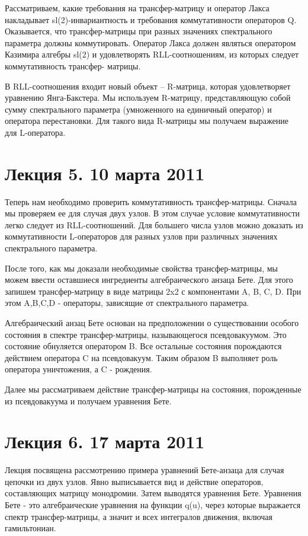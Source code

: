 \documentclass[a4paper,12pt]{article}
\theoremstyle{definition} \newtheorem{Def}{Definition}
\theoremstyle{definition}
\begin{document}
Рассматриваем, какие требования на трансфер-матрицу и оператор Лакса накладывает sl(2)-инвариантность и требования коммутативности операторов Q. Оказывается, что трансфер-матрицы при разных значениях спектрального параметра должны коммутировать. Оператор Лакса должен являться оператором Казимира алгебры sl(2) и удовлетворять RLL-соотношениям, из которых следует коммутативность трансфер- матрицы. 

В RLL-соотношения входит новый объект -- R-матрица, которая удовлетворяет уравнению Янга-Бакстера. Мы используем R-матрицу, представляющую собой сумму спектрального параметра (умноженного на единичный оператор) и оператора перестановки. 
Для такого вида R-матрицы мы получаем выражение для L-оператора.

\section{Лекция 5. 10 марта 2011}

Теперь нам необходимо проверить коммутативность трансфер-матрицы. 
Сначала мы проверяем ее для случая двух узлов. В этом случае условие коммутативности легко следует из RLL-соотношений. Для большего числа узлов можно доказать из коммутативности L-операторов для разных узлов при различных значениях спектрального параметра. 

После того, как мы доказали необходимые свойства трансфер-матрицы, мы можем ввести оставшиеся ингредиенты алгебраического анзаца Бете. Для этого запишем трансфер-матрицу в виде матрицы 2x2 с компонентами A, B, C, D. При этом A,B,C,D - операторы, зависящие от спектрального параметра.

Алгебраический анзац Бете основан на предположении о существовании особого состояния в спектре трансфер-матрицы, называющегося псевдовакуумом.  Это состояние обнуляется оператором B. Все остальные состояния порождаются действием оператора C на псевдовакуум. Таким образом B выполняет роль оператора уничтожения, а C - рождения. 

Далее мы рассматриваем действие трансфер-матрицы на состояния, порожденные из псевдовакуума и получаем уравнения Бете.
\section{Лекция 6. 17 марта 2011}

Лекция посвящена рассмотрению примера уравнений Бете-анзаца для случая цепочки из двух узлов. Явно выписывается вид и действие операторов, составляющих матрицу монодромии. Затем выводятся уравнения Бете. Уравнения Бете - это алгебраические уравнения на функции q(u), через которые выражается спектр трансфер-матрицы, а значит и всех интегралов движения, включая гамильтониан.
\end{document}
